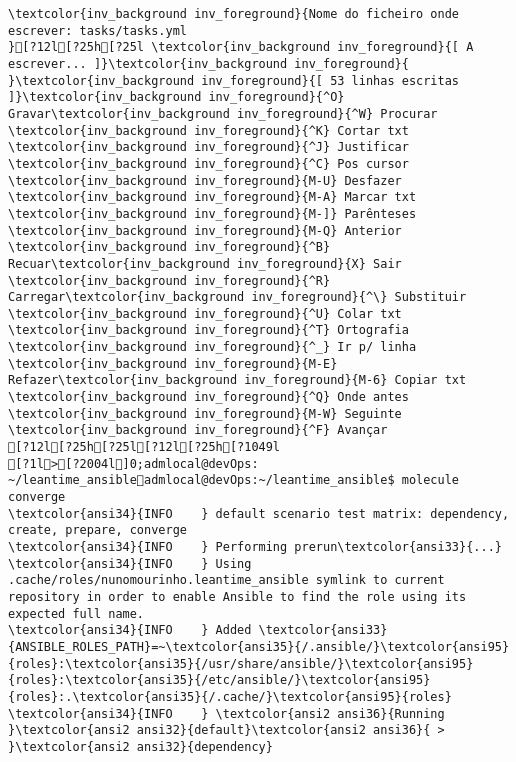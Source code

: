 \documentclass{scrartcl}
\begin{document}
\begin{Verbatim}
\textcolor{inv_background inv_foreground}{Nome do ficheiro onde escrever: tasks/tasks.yml                                                                                                                                              }[?12l[?25h[?25l \textcolor{inv_background inv_foreground}{[ A escrever... ]}\textcolor{inv_background inv_foreground}{          }\textcolor{inv_background inv_foreground}{[ 53 linhas escritas ]}\textcolor{inv_background inv_foreground}{^O} Gravar\textcolor{inv_background inv_foreground}{^W} Procurar      \textcolor{inv_background inv_foreground}{^K} Cortar txt    \textcolor{inv_background inv_foreground}{^J} Justificar    \textcolor{inv_background inv_foreground}{^C} Pos cursor    \textcolor{inv_background inv_foreground}{M-U} Desfazer     \textcolor{inv_background inv_foreground}{M-A} Marcar txt   \textcolor{inv_background inv_foreground}{M-]} Parênteses   \textcolor{inv_background inv_foreground}{M-Q} Anterior     \textcolor{inv_background inv_foreground}{^B} Recuar\textcolor{inv_background inv_foreground}{X} Sair    \textcolor{inv_background inv_foreground}{^R} Carregar\textcolor{inv_background inv_foreground}{^\} Substituir    \textcolor{inv_background inv_foreground}{^U} Colar txt     \textcolor{inv_background inv_foreground}{^T} Ortografia    \textcolor{inv_background inv_foreground}{^_} Ir p/ linha   \textcolor{inv_background inv_foreground}{M-E} Refazer\textcolor{inv_background inv_foreground}{M-6} Copiar txt   \textcolor{inv_background inv_foreground}{^Q} Onde antes    \textcolor{inv_background inv_foreground}{M-W} Seguinte     \textcolor{inv_background inv_foreground}{^F} Avançar
[?12l[?25h[?25l[?12l[?25h[?1049l
[?1l>[?2004l]0;admlocal@devOps: ~/leantime_ansibleadmlocal@devOps:~/leantime_ansible$ molecule converge
\textcolor{ansi34}{INFO    } default scenario test matrix: dependency, create, prepare, converge
\textcolor{ansi34}{INFO    } Performing prerun\textcolor{ansi33}{...}
\textcolor{ansi34}{INFO    } Using .cache/roles/nunomourinho.leantime_ansible symlink to current repository in order to enable Ansible to find the role using its expected full name.
\textcolor{ansi34}{INFO    } Added \textcolor{ansi33}{ANSIBLE_ROLES_PATH}=~\textcolor{ansi35}{/.ansible/}\textcolor{ansi95}{roles}:\textcolor{ansi35}{/usr/share/ansible/}\textcolor{ansi95}{roles}:\textcolor{ansi35}{/etc/ansible/}\textcolor{ansi95}{roles}:.\textcolor{ansi35}{/.cache/}\textcolor{ansi95}{roles}
\textcolor{ansi34}{INFO    } \textcolor{ansi2 ansi36}{Running }\textcolor{ansi2 ansi32}{default}\textcolor{ansi2 ansi36}{ > }\textcolor{ansi2 ansi32}{dependency}

\end{Verbatim}
\end{document}
